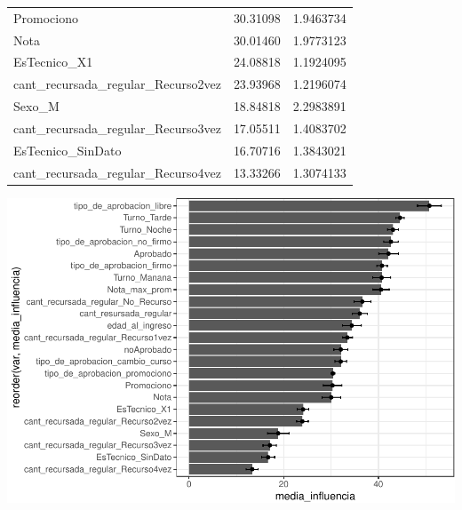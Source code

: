\documentclass[]{article}
\begin{document}
\begin{table}[!h]
\begin{tabular}[t]{lrr}
\addlinespace
Promociono & 30.31098 & 1.9463734\\
\rowcolor{gray!6}  Nota & 30.01460 & 1.9773123\\
EsTecnico\_X1 & 24.08818 & 1.1924095\\
\rowcolor{gray!6}  cant\_recursada\_regular\_Recurso2vez & 23.93968 & 1.2196074\\
Sexo\_M & 18.84818 & 2.2983891\\
\addlinespace
\rowcolor{gray!6}  cant\_recursada\_regular\_Recurso3vez & 17.05511 & 1.4083702\\
EsTecnico\_SinDato & 16.70716 & 1.3843021\\
\rowcolor{gray!6}  cant\_recursada\_regular\_Recurso4vez & 13.33266 & 1.3074133\\
\bottomrule
\end{tabular}
\end{table}

\includegraphics{seleccion_variables_experimental_analisis_files/figure-latex/influencia_de_variables_23-1.pdf}
\end{document}
